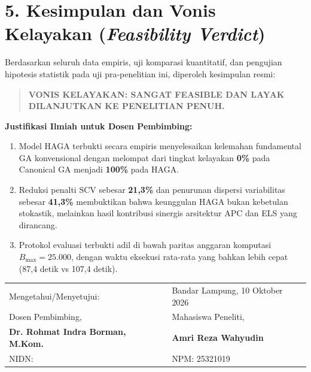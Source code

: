 \documentclass[a4paper,11pt]{article}
\begin{document}
\section*{5. Kesimpulan dan Vonis Kelayakan (\textit{Feasibility Verdict})}
Berdasarkan seluruh data empiris, uji komparasi kuantitatif, dan pengujian hipotesis statistik pada uji pra-penelitian ini, diperoleh kesimpulan resmi:
\begin{quote}
    \textbf{VONIS KELAYAKAN: SANGAT FEASIBLE DAN LAYAK DILANJUTKAN KE PENELITIAN PENUH.}
\end{quote}
\noindent\textbf{Justifikasi Ilmiah untuk Dosen Pembimbing:}
\begin{enumerate}\setlength\itemsep{0.1em}
    \item Model HAGA terbukti secara empiris menyelesaikan kelemahan fundamental GA konvensional dengan melompat dari tingkat kelayakan \textbf{0\%} pada Canonical GA menjadi \textbf{100\%} pada HAGA.
    \item Reduksi penalti $\text{SCV}$ sebesar \textbf{21{,}3\%} dan penurunan dispersi variabilitas sebesar \textbf{41{,}3\%} membuktikan bahwa keunggulan HAGA bukan kebetulan stokastik, melainkan hasil kontribusi sinergis arsitektur APC dan ELS yang dirancang.
    \item Protokol evaluasi terbukti adil di bawah paritas anggaran komputasi $B_{\max} = 25.000$, dengan waktu eksekusi rata-rata yang bahkan lebih cepat (87,4 detik vs 107,4 detik).
\end{enumerate}

\vspace{0.4cm}
\noindent\begin{tabularx}{\textwidth}{Xp{6.5cm}}
    Mengetahui/Menyetujui: & Bandar Lampung, 10 Oktober 2026 \\
    Dosen Pembimbing, & Mahasiswa Peneliti, \\[1.8cm]
    \textbf{Dr. Rohmat Indra Borman, M.Kom.} & \textbf{Amri Reza Wahyudin} \\
    NIDN: & NPM: 25321019 \\
\end{tabularx}
\end{document}
